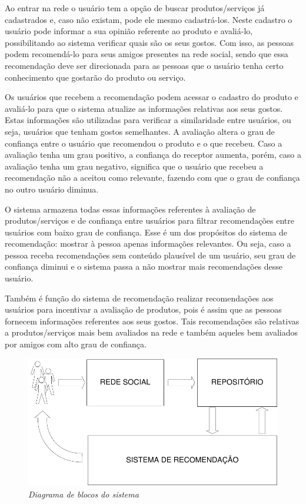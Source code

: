  Ao entrar na rede o usuário tem a opção de buscar produtos/serviços já cadastrados e, caso não existam, pode ele mesmo cadastrá-los. Neste cadastro o usuário pode informar a sua opinião referente ao produto e avaliá-lo, possibilitando ao sistema verificar quais são os seus gostos. Com isso, as pessoas podem recomendá-lo para seus amigos presentes na rede social, sendo que essa recomendação deve ser direcionada para as pessoas que o usuário tenha certo conhecimento que gostarão do produto ou serviço.

 Os usuários que recebem a recomendação podem acessar o cadastro do produto e avaliá-lo para que o sistema atualize as informações relativas aos seus gostos. Estas informações são utilizadas para verificar a similaridade entre usuários, ou seja, usuários que tenham gostos semelhantes. A avaliação altera o grau de confiança entre o usuário que recomendou o produto e o que recebeu. Caso a avaliação tenha um grau positivo, a confiança do receptor aumenta, porém, caso a avaliação tenha um grau negativo, significa que o usuário que recebeu a recomendação não a aceitou como relevante, fazendo com que o grau de confiança no outro usuário diminua.

 O sistema armazena todas essas informações referentes à avaliação de produtos/serviços e de confiança entre usuários para filtrar recomendações entre usuários com baixo grau de confiança. Esse é um dos propósitos do sistema de recomendação: mostrar à pessoa apenas informações relevantes. Ou seja, caso a pessoa receba recomendações sem conteúdo plausível de um usuário, seu grau de confiança diminui e o sistema passa a não mostrar mais recomendações desse usuário.

 Também é função do sistema de recomendação realizar recomendações aos usuários para incentivar a avaliação de produtos, pois é assim que as pessoas fornecem informações referentes aos seus gostos. Tais recomendações são relativas a produtos/serviços mais bem avaliados na rede e também aqueles bem avaliados por amigos com alto grau de confiança.

\begin{figure}
  \centering
  \includegraphics[width=\textwidth]{imagens/Diagrama_Visao_Geral}
  \caption{\it Diagrama de blocos do sistema}
  \label{fig:escopo}
\end{figure}

